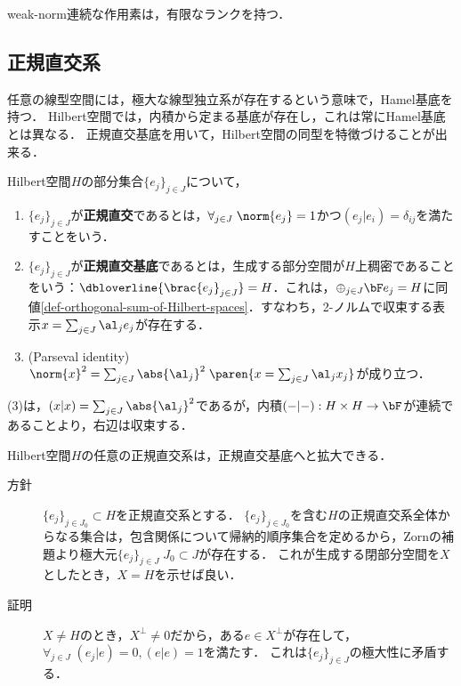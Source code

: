 \documentclass[uplatex,dvipdfmx]{jsreport}
\begin{document}
\begin{proposition}[有限ランク作用素の十分条件]
    weak-norm連続な作用素は，有限なランクを持つ．
\end{proposition}

\subsection{正規直交系}

\begin{tcolorbox}[colframe=ForestGreen, colback=ForestGreen!10!white,breakable,colbacktitle=ForestGreen!40!white,coltitle=black,fonttitle=\bfseries\sffamily,
title=]
    任意の線型空間には，極大な線型独立系が存在するという意味で，Hamel基底を持つ．
    Hilbert空間では，内積から定まる基底が存在し，これは常にHamel基底とは異なる．
    正規直交基底を用いて，Hilbert空間の同型を特徴づけることが出来る．
\end{tcolorbox}

\begin{definition}
    Hilbert空間$H$の部分集合$\{e_j\}_{j\in J}$について，
    \begin{enumerate}
        \item $\{e_j\}_{j\in J}$が\textbf{正規直交}であるとは，$\forall_{j\in J}\;\norm{e_j}=1$かつ$(e_j|e_i)=\delta_{ij}$を満たすことをいう．
        \item $\{e_j\}_{j\in J}$が\textbf{正規直交基底}であるとは，生成する部分空間が$H$上稠密であることをいう：$\dbloverline{\brac{e_j}_{j\in J}}=H$．これは，$\oplus_{j\in J}\bF e_j=H$に同値\ref{def-orthogonal-sum-of-Hilbert-spaces}．すなわち，2-ノルムで収束する表示$x=\sum_{j\in J}\al_j e_j$が存在する．
        \item (Parseval identity) $\norm{x}^2=\sum_{j\in J}\abs{\al_j}^2\;\paren{x=\sum_{j\in J}\al_jx_j}$が成り立つ．
    \end{enumerate}
\end{definition}
\begin{Proof}
    (3)は，$(x|x)=\sum_{j\in J}\abs{\al_j}^2$であるが，内積$(-|-):H\times H\to\bF$が連続であることより，右辺は収束する．
\end{Proof}

\begin{proposition}
    Hilbert空間$H$の任意の正規直交系は，正規直交基底へと拡大できる．
\end{proposition}
\begin{Proof}\mbox{}
    \begin{description}
        \item[方針] $\{e_j\}_{j\in J_0}\subset H$を正規直交系とする．
        $\{e_j\}_{j\in J_0}$を含む$H$の正規直交系全体からなる集合は，包含関係について帰納的順序集合を定めるから，Zornの補題より極大元$\{e_j\}_{j\in J}\;J_0\subset J$が存在する．
        これが生成する閉部分空間を$X$としたとき，$X=H$を示せば良い．
        \item[証明] 
        $X\ne H$のとき，$X^\perp\ne 0$だから，ある$e\in X^\perp$が存在して，$\forall_{j\in J}\;(e_j|e)=0,(e|e)=1$を満たす．
        これは$\{e_j\}_{j\in J}$の極大性に矛盾する．
    \end{description}
\end{Proof}
\end{document}
